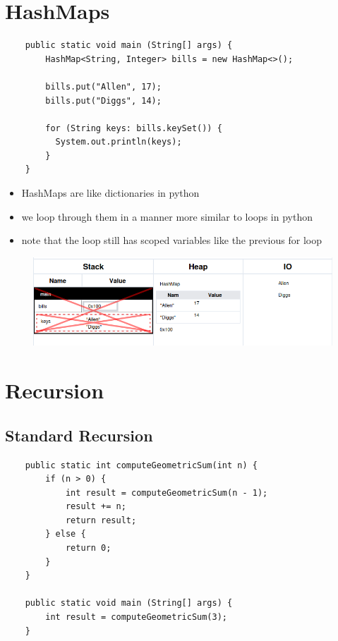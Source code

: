 \documentclass{article}
\begin{document}
\pagebreak


\section{HashMaps}

\begin{verbatim}
	public static void main (String[] args) {
	    HashMap<String, Integer> bills = new HashMap<>();
	    
	    bills.put("Allen", 17);
	    bills.put("Diggs", 14);
	    
	    for (String keys: bills.keySet()) {
	      System.out.println(keys);
	    }
	}
\end{verbatim}

\begin{itemize}
	\item HashMaps are like dictionaries in python
	\item we loop through them in a manner more similar to loops in python
	\item note that the loop still has scoped variables like the previous for loop
\end{itemize}

\begin{figure}[H]
	\centering
	\includegraphics{hashMaps.png}
\end{figure}

\pagebreak


\section{Recursion}

\subsection{Standard Recursion}

\begin{verbatim}
	public static int computeGeometricSum(int n) {
	    if (n > 0) {
	        int result = computeGeometricSum(n - 1);
	        result += n;
	        return result;
	    } else {
	        return 0;
	    }
	}

	public static void main (String[] args) {
	    int result = computeGeometricSum(3);
	}
\end{verbatim}
\end{document}
